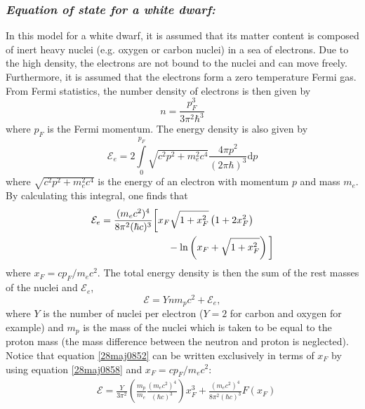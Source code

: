 \documentclass[twocolumn]{article}
\begin{document}
\begin{large}
\subsubsection*{\textit{Equation of state for a white dwarf:}}
In this model for a white dwarf, it is assumed that its matter content is composed of inert heavy nuclei (e.g. oxygen or carbon nuclei) in a sea of electrons. Due to the high density, the electrons are not bound to the nuclei and can move freely. Furthermore, it is assumed that the electrons form a zero temperature Fermi gas. From Fermi statistics, the number density of electrons is then given by
\begin{equation}
    \label{28maj0858}
    n = \frac{p_F^3}{3\pi^2\hbar^3}
\end{equation}
where $p_F$ is the Fermi momentum. The energy density is also given by 
\begin{equation}
    \mathcal{E}_e = 2\int\limits_0^{p_F}\sqrt{c^2p^2+m_e^2c^4}\frac{4\pi p^2}{(2\pi\hbar)^3}\text{d}p
\end{equation}
where $\sqrt{c^2p^2+m_e^2c^4}$ is the energy of an electron with momentum $p$ and mass $m_e$. By calculating this integral, one finds that 
\begin{equation}
    \label{28maj0910}
    \begin{split}
        &\mathcal{E}_e = \frac{(m_ec^2)^4}{8\pi^2(\hbar c)^3}\bigg[x_F\sqrt{1+x_F^2}\left(1+2x_F^2\right) \\ 
        &\hspace{2.75cm}-\ln\left(x_F+\sqrt{1+x_F^2}\right)\bigg] \\ 
    \end{split}
\end{equation}
where $x_F = cp_F/m_ec^2$. The total energy density is then the sum of the rest masses of the nuclei and $\mathcal{E}_e$,
\begin{equation}
    \label{28maj0852}
    \mathcal{E} = Ynm_pc^2 + \mathcal{E}_e,
\end{equation}
where $Y$ is the number of nuclei per electron ($Y=2$ for carbon and oxygen for example) and $m_p$ is the mass of the nuclei which is taken to be equal to the proton mass (the mass difference between the neutron and proton is neglected). Notice that equation \eqref{28maj0852} can be written exclusively in terms of $x_F$ by using equation \eqref{28maj0858} and $x_F=cp_F/m_ec^2$:
\begin{equation}
    \label{28maj1110}
    \begin{split}
        &\mathcal{E}=\frac{Y}{3\pi^2}\left(\frac{m_p}{m_e}\frac{(m_ec^2)^4}{(\hbar c)^3}\right)x_F^3 + \frac{(m_ec^2)^4}{8\pi^2(\hbar c)^3}F(x_F)

\end{split}
\end{equation}
\end{large}
\end{document}
